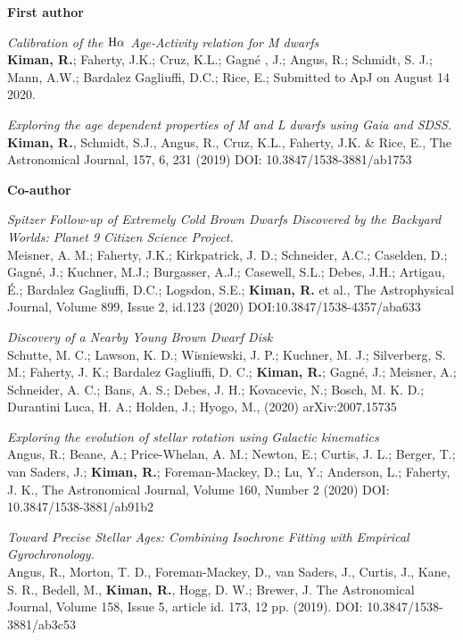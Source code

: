 \documentclass[10pt]{cv}
\begin{document}
\begin{llist}

\textbf{First author}

\textit{Calibration of the ${\rm H}\alpha$ Age-Activity relation for M dwarfs}\\
\textbf{Kiman, R.}; Faherty, J.K.; Cruz, K.L.; Gagn\'e , J.; Angus, R.; Schmidt, S. J.; Mann, A.W.; Bardalez Gagliuffi, D.C.; Rice, E.; Submitted to ApJ on August 14 2020. 

\textit{Exploring the age dependent properties of M and L dwarfs using \textit{Gaia} and SDSS.}\\
\textbf{Kiman, R.}, Schmidt, S.J., Angus, R., Cruz, K.L., Faherty, J.K. \& Rice, E., The Astronomical Journal, 157, 6, 231 (2019) DOI: 10.3847/1538-3881/ab1753 

\textbf{Co-author}

\textit{Spitzer Follow-up of Extremely Cold Brown Dwarfs Discovered by the Backyard Worlds: Planet 9 Citizen Science Project.}\\
Meisner, A. M.; Faherty, J.K.; Kirkpatrick, J. D.; Schneider, A.C.; Caselden, D.; Gagné, J.; Kuchner, M.J.; Burgasser, A.J.; Casewell, S.L.; Debes, J.H.; Artigau, É.; Bardalez Gagliuffi, D.C.; Logsdon, S.E.; \textbf{Kiman, R.} et al., The Astrophysical Journal, Volume 899, Issue 2, id.123 (2020) DOI:10.3847/1538-4357/aba633

\textit{Discovery of a Nearby Young Brown Dwarf Disk}\\
Schutte, M. C.; Lawson, K. D.; Wisniewski, J. P.; Kuchner, M. J.; Silverberg, S. M.; Faherty, J. K.; Bardalez Gagliuffi, D. C.; \textbf{Kiman, R.}; Gagné, J.; Meisner, A.; Schneider, A. C.; Bans, A. S.; Debes, J. H.; Kovacevic, N.; Bosch, M. K. D.; Durantini Luca, H. A.; Holden, J.; Hyogo, M., (2020) arXiv:2007.15735

\textit{Exploring the evolution of stellar rotation using Galactic kinematics}\\
Angus, R.; Beane, A.; Price-Whelan, A. M.; Newton, E.; Curtis, J. L.; Berger, T.; van Saders, J.; \textbf{Kiman, R.}; Foreman-Mackey, D.; Lu, Y.; Anderson, L.; Faherty, J. K., The Astronomical Journal, Volume 160, Number 2 (2020) DOI: 10.3847/1538-3881/ab91b2

\textit{Toward Precise Stellar Ages: Combining Isochrone Fitting with Empirical Gyrochronology.}\\ 
Angus, R., Morton, T. D., Foreman-Mackey, D., van Saders, J., Curtis, J., Kane, S. R., Bedell, M., \textbf{Kiman, R.}, Hogg, D. W.; Brewer, J. The Astronomical Journal, Volume 158, Issue 5, article id. 173, 12 pp. (2019). DOI: 10.3847/1538-3881/ab3c53


\end{llist}
\end{document}
